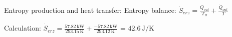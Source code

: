 Entropy production and heat transfer:  
Entropy balance:  
\( \dot{S}_{erz} = \frac{Q_{out}}{T_R} + \frac{\dot{Q}_{out}}{T} \)  

Calculation:  
\( \dot{S}_{erz} = \frac{57.82 \, \text{kW}}{293.15 \, \text{K}} + \frac{-57.82 \, \text{kW}}{293.12 \, \text{K}} \)  
= \( 42.6 \, \text{J/K} \)